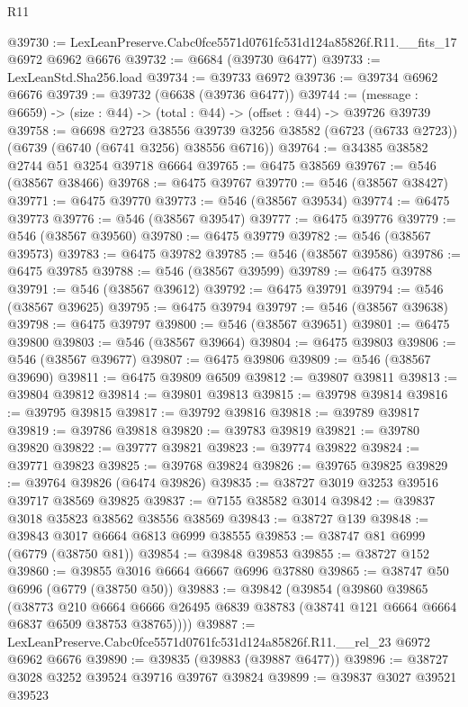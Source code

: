 \begin{lexlean}{R11}
\begin{coremodule}
@39730 := LexLeanPreserve.Cabc0fce5571d0761fc531d124a85826f.R11.__fits_17 @6972 @6962 @6676
@39732 := @6684 (@39730 @6477)
@39733 := LexLeanStd.Sha256.load
@39734 := @39733 @6972
@39736 := @39734 @6962 @6676
@39739 := @39732 (@6638 (@39736 @6477))
@39744 := (message : @6659) -> (size : @44) -> (total : @44) -> (offset : @44) -> @39726 @39739
@39758 := @6698
    @2723
    @38556
    @39739
    @3256
    @38582
    (@6723 (@6733 @2723))
    (@6739 (@6740 (@6741 @3256) @38556 @6716))
@39764 := @34385 @38582 @2744 @51 @3254 @39718 @6664
@39765 := @6475 @38569
@39767 := @546 (@38567 @38466)
@39768 := @6475 @39767
@39770 := @546 (@38567 @38427)
@39771 := @6475 @39770
@39773 := @546 (@38567 @39534)
@39774 := @6475 @39773
@39776 := @546 (@38567 @39547)
@39777 := @6475 @39776
@39779 := @546 (@38567 @39560)
@39780 := @6475 @39779
@39782 := @546 (@38567 @39573)
@39783 := @6475 @39782
@39785 := @546 (@38567 @39586)
@39786 := @6475 @39785
@39788 := @546 (@38567 @39599)
@39789 := @6475 @39788
@39791 := @546 (@38567 @39612)
@39792 := @6475 @39791
@39794 := @546 (@38567 @39625)
@39795 := @6475 @39794
@39797 := @546 (@38567 @39638)
@39798 := @6475 @39797
@39800 := @546 (@38567 @39651)
@39801 := @6475 @39800
@39803 := @546 (@38567 @39664)
@39804 := @6475 @39803
@39806 := @546 (@38567 @39677)
@39807 := @6475 @39806
@39809 := @546 (@38567 @39690)
@39811 := @6475 @39809 @6509
@39812 := @39807 @39811
@39813 := @39804 @39812
@39814 := @39801 @39813
@39815 := @39798 @39814
@39816 := @39795 @39815
@39817 := @39792 @39816
@39818 := @39789 @39817
@39819 := @39786 @39818
@39820 := @39783 @39819
@39821 := @39780 @39820
@39822 := @39777 @39821
@39823 := @39774 @39822
@39824 := @39771 @39823
@39825 := @39768 @39824
@39826 := @39765 @39825
@39829 := @39764 @39826 (@6474 @39826)
@39835 := @38727 @3019 @3253 @39516 @39717 @38569 @39825
@39837 := @7155 @38582 @3014
@39842 := @39837 @3018 @35823 @38562 @38556 @38569
@39843 := @38727 @139
@39848 := @39843 @3017 @6664 @6813 @6999 @38555
@39853 := @38747 @81 @6999 (@6779 (@38750 @81))
@39854 := @39848 @39853
@39855 := @38727 @152
@39860 := @39855 @3016 @6664 @6667 @6996 @37880
@39865 := @38747 @50 @6996 (@6779 (@38750 @50))
@39883 := @39842
    (@39854
      (@39860
        @39865
        (@38773
          @210
          @6664
          @6666
          @26495
          @6839
          @38783
          (@38741 @121 @6664 @6664 @6837 @6509 @38753 @38765))))
@39887 := LexLeanPreserve.Cabc0fce5571d0761fc531d124a85826f.R11.__rel_23 @6972 @6962 @6676
@39890 := @39835 (@39883 (@39887 @6477))
@39896 := @38727 @3028 @3252 @39524 @39716 @39767 @39824
@39899 := @39837 @3027 @39521 @39523

\end{coremodule}
\end{lexlean}
